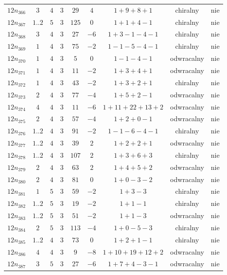 \begin{longtable}{ccccccccc}
$12n_{366}$ & $3$ & $4$ & $3$ & $29$ & $4$ & $1+9+8+1$ & chiralny & nie \\
$12n_{367}$ & $1..2$ & $5$ & $3$ & $125$ & $0$ & $1+1+4-1$ & chiralny & nie \\
$12n_{368}$ & $3$ & $4$ & $3$ & $27$ & $-6$ & $1+3-1-4-1$ & chiralny & nie \\
$12n_{369}$ & $1$ & $4$ & $3$ & $75$ & $-2$ & $1-1-5-4-1$ & chiralny & nie \\
$12n_{370}$ & $1$ & $4$ & $3$ & $5$ & $0$ & $1-1-4-1$ & odwracalny & nie \\
$12n_{371}$ & $1$ & $4$ & $3$ & $11$ & $-2$ & $1+3+4+1$ & odwracalny & nie \\
$12n_{372}$ & $1$ & $4$ & $3$ & $43$ & $-2$ & $1+3+2+1$ & chiralny & nie \\
$12n_{373}$ & $2$ & $4$ & $3$ & $77$ & $-4$ & $1+5+2-1$ & odwracalny & nie \\
$12n_{374}$ & $4$ & $4$ & $3$ & $11$ & $-6$ & $1+11+22+13+2$ & odwracalny & nie \\
$12n_{375}$ & $2$ & $4$ & $3$ & $57$ & $-4$ & $1+2+0-1$ & odwracalny & nie \\
$12n_{376}$ & $1..2$ & $4$ & $3$ & $91$ & $-2$ & $1-1-6-4-1$ & chiralny & nie \\
$12n_{377}$ & $1..2$ & $4$ & $3$ & $39$ & $2$ & $1+2+2+1$ & odwracalny & nie \\
$12n_{378}$ & $1..2$ & $4$ & $3$ & $107$ & $2$ & $1+3+6+3$ & chiralny & nie \\
$12n_{379}$ & $2$ & $4$ & $3$ & $63$ & $2$ & $1+4+5+2$ & odwracalny & nie \\
$12n_{380}$ & $2$ & $4$ & $3$ & $81$ & $0$ & $1+0-3-2$ & odwracalny & nie \\
$12n_{381}$ & $1$ & $5$ & $3$ & $59$ & $-2$ & $1+3-3$ & chiralny & nie \\
$12n_{382}$ & $1..2$ & $5$ & $3$ & $19$ & $-2$ & $1+1-1$ & chiralny & nie \\
$12n_{383}$ & $1..2$ & $5$ & $3$ & $51$ & $-2$ & $1+1-3$ & odwracalny & nie \\
$12n_{384}$ & $2$ & $5$ & $3$ & $113$ & $-4$ & $1+0-5-3$ & chiralny & nie \\
$12n_{385}$ & $1..2$ & $4$ & $3$ & $73$ & $0$ & $1+2+1-1$ & chiralny & nie \\
$12n_{386}$ & $4$ & $4$ & $3$ & $9$ & $-8$ & $1+10+19+12+2$ & odwracalny & nie \\
$12n_{387}$ & $3$ & $5$ & $3$ & $27$ & $-6$ & $1+7+4-3-1$ & odwracalny & nie \\

\end{longtable}
